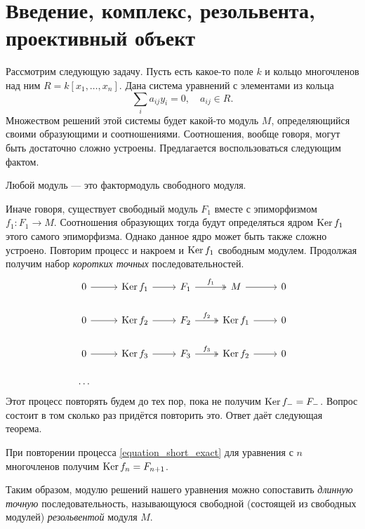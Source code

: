\documentclass[../main.tex]{subfiles}
\begin{document}
\section{Введение, комплекс, резольвента, проективный объект}
Рассмотрим следующую задачу. Пусть есть какое-то поле $k$ и кольцо многочленов над ним $R=k[x_1, \ldots, x_n]$. Дана система уравнений с элементами из кольца
\begin{equation*}
    \sum_i a_{ij}y_i = 0, \quad a_{ij}\in R.
\end{equation*}
Множеством решений этой системы будет какой-то модуль $M$, определяющийся своими образующими и соотношениями. Соотношения, вообще говоря, могут быть достаточно сложно устроены. Предлагается воспользоваться следующим фактом.
\begin{to_suj}\label{free_factor}
Любой модуль --- это фактормодуль свободного модуля.
\end{to_suj}
Иначе говоря, существует свободный модуль $F_1$ вместе с эпиморфизмом $f_1:F_1\to M$. Соотношения образующих тогда будут определяться ядром $\mathop{\mathrm{Ker}}\nolimits f_1$ этого самого эпиморфизма. Однако данное ядро может быть также сложно устроено. Повторим процесс и накроем и $\mathop{\mathrm{Ker}}\nolimits f_1$ свободным модулем. Продолжая получим набор \emph{коротких точных} последовательностей.
\begin{equation}\label{equation_short_exact}
\begin{tikzcd}
	0 & {\Ker f_1} & {F_1} & M & 0 \\
	0 & {\Ker f_2} & {F_2} & {\Ker f_1} & 0 \\
	0 & {\Ker f_3} & {F_3} & {\Ker f_2} & 0 \\
	\ldots & {} & {}
	\arrow[from=1-4, to=1-5]
	\arrow["{f_1}", two heads, from=1-3, to=1-4]
	\arrow[from=1-2, to=1-3]
	\arrow[from=2-4, to=2-5]
	\arrow["{f_2}", two heads, from=2-3, to=2-4]
	\arrow[from=2-2, to=2-3]
	\arrow[from=3-4, to=3-5]
	\arrow["{f_3}", two heads, from=3-3, to=3-4]
	\arrow[from=3-2, to=3-3]
	\arrow[from=3-1, to=3-2]
	\arrow[from=2-1, to=2-2]
	\arrow[from=1-1, to=1-2]
\end{tikzcd}
\end{equation}
Этот процесс повторять будем до тех пор, пока не получим $\mathop{\mathrm{Ker}}\nolimits f_- = F_-$. Вопрос состоит в том сколько раз придётся повторить это. Ответ даёт следующая теорема.
\begin{to_thr}
При повторении процесса \eqref{equation_short_exact} для уравнения с $n$ многочленов получим $\mathop{\mathrm{Ker}}\nolimits f_n = F_{n+1}$.
\end{to_thr}
Таким образом, модулю решений нашего уравнения можно сопоставить \emph{длинную точную} последовательность, называющуюся свободной (состоящей из свободных модулей) \emph{резольвентой} модуля $M$.
\end{document}
